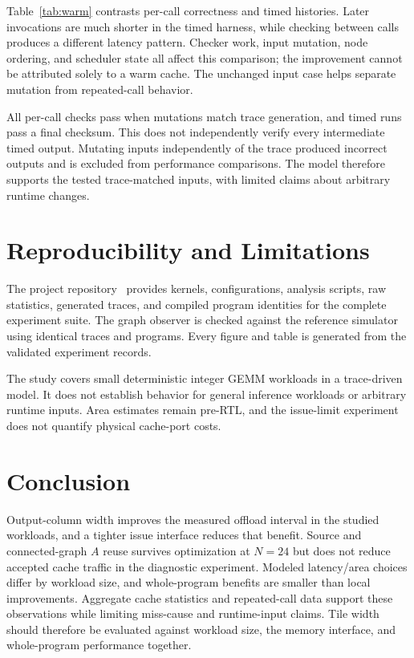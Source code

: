 \documentclass[conference,letterpaper]{IEEEtran}
\begin{document}

Table~\ref{tab:warm} contrasts per-call correctness and timed histories.
Later invocations are much shorter in the timed harness, while checking
between calls produces a different latency pattern. Checker work, input
mutation, node ordering, and scheduler state all affect this comparison;
the improvement cannot be attributed solely to a warm cache. The unchanged
input case helps separate mutation from repeated-call behavior.

All per-call checks pass when mutations match trace generation, and timed
runs pass a final checksum. This does not independently verify every
intermediate timed output. Mutating inputs independently of the trace
produced incorrect outputs and is excluded from performance comparisons.
The model therefore supports the tested trace-matched inputs, with limited
claims about arbitrary runtime changes.

\section{Reproducibility and Limitations}
The project repository~\cite{artifacts} provides kernels, configurations,
analysis scripts, raw statistics, generated traces, and compiled program
identities for the complete experiment suite. The graph observer is checked
against the reference simulator using identical traces and programs. Every
figure and table is generated from the validated experiment records.

The study covers small deterministic integer GEMM workloads in a
trace-driven model. It does not establish behavior for general inference
workloads or arbitrary runtime inputs. Area estimates remain pre-RTL,
and the issue-limit experiment does not quantify physical cache-port costs.

\section{Conclusion}
Output-column width improves the measured offload interval in the studied
workloads, and a tighter issue interface reduces that benefit. Source and
connected-graph $A$ reuse survives optimization at $N=24$ but does not reduce
accepted cache traffic in the diagnostic experiment. Modeled latency/area
choices differ by workload size, and whole-program benefits are smaller than
local improvements. Aggregate cache statistics and repeated-call data
support these observations while limiting miss-cause and runtime-input
claims. Tile width should therefore be evaluated against workload size,
the memory interface, and whole-program performance together.
\end{document}
